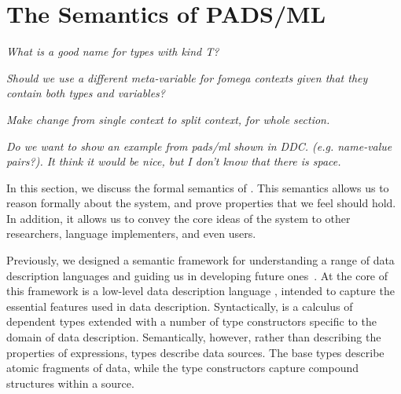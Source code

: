\section{The Semantics of PADS/ML}
\label{sec:ddc}
\emph{What is a good name for types with kind T?}

{\em Should we use a different meta-variable for fomega contexts given
  that they contain both types and variables?}

\emph{Make change from single \fomega context to split context, for
  whole section.}

\emph{Do we want to show an example from pads/ml shown in DDC.
  (e.g. name-value pairs?). It think it would be nice, but I don't
  know that there is space.  }


In this section, we discuss the formal semantics of \padsml{}. This
semantics allows us to reason formally about the system, and prove
properties that we feel should hold. In addition, it allows us to
convey the core ideas of the system to other researchers, language
implementers, and even users.

Previously, we designed a semantic framework for understanding a range
of data description languages and guiding us in developing future
ones~\cite{fisher+:next700ddl}. At the core of this framework is a
low-level data description language \ddcold{}, intended to capture the
essential features used in data description.  Syntactically, \ddcold{}
is a calculus of dependent types extended with a number of type
constructors specific to the domain of data description. Semantically,
however, rather than describing the properties of expressions,
\ddcold{} types describe data sources. The base types describe atomic
fragments of data, while the type constructors capture compound
structures within a source.

